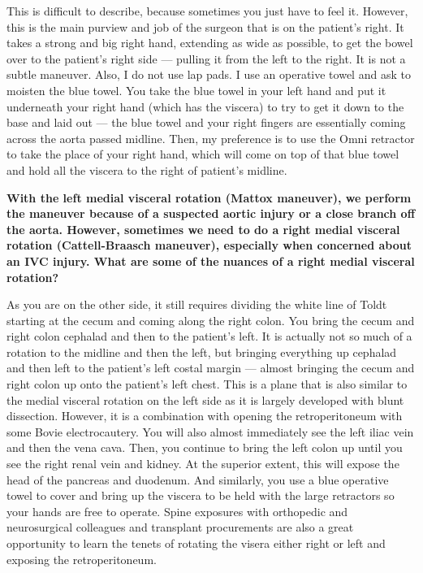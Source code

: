 \documentclass[
]{book}
\begin{document}
This is difficult to describe, because sometimes you just have to feel
it. However, this is the main purview and job of the surgeon that is on
the patient's right. It takes a strong and big right hand, extending as
wide as possible, to get the bowel over to the patient's right side ---
pulling it from the left to the right. It is not a subtle maneuver.
Also, I do not use lap pads. I use an operative towel and ask to moisten
the blue towel. You take the blue towel in your left hand and put it
underneath your right hand (which has the viscera) to try to get it down
to the base and laid out --- the blue towel and your right fingers are
essentially coming across the aorta passed midline. Then, my preference
is to use the Omni retractor to take the place of your right hand, which
will come on top of that blue towel and hold all the viscera to the
right of patient's midline.

\textbf{With the left medial visceral rotation (Mattox maneuver), we perform
the maneuver because of a suspected aortic injury or a close branch off
the aorta. However, sometimes we need to do a right medial visceral
rotation (Cattell-Braasch maneuver), especially when concerned about an
IVC injury. What are some of the nuances of a right medial visceral
rotation?}

As you are on the other side, it still requires dividing the white line
of Toldt starting at the cecum and coming along the right colon. You
bring the cecum and right colon cephalad and then to the patient's left.
It is actually not so much of a rotation to the midline and then the
left, but bringing everything up cephalad and then left to the patient's
left costal margin --- almost bringing the cecum and right colon up onto
the patient's left chest. This is a plane that is also similar to the
medial visceral rotation on the left side as it is largely developed
with blunt dissection. However, it is a combination with opening the
retroperitoneum with some Bovie electrocautery. You will also almost
immediately see the left iliac vein and then the vena cava. Then, you
continue to bring the left colon up until you see the right renal vein
and kidney. At the superior extent, this will expose the head of the
pancreas and duodenum. And similarly, you use a blue operative towel to
cover and bring up the viscera to be held with the large retractors so
your hands are free to operate. Spine exposures with orthopedic and
neurosurgical colleagues and transplant procurements are also a great
opportunity to learn the tenets of rotating the visera either right or
left and exposing the retroperitoneum.
\end{document}
